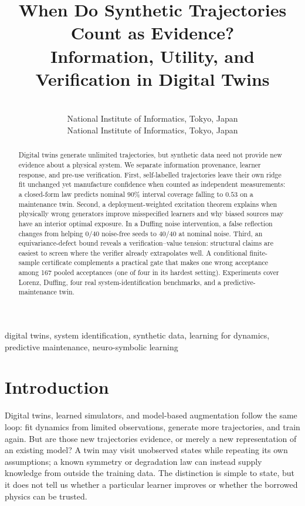 \documentclass{l4dc2027}
\title[When Do Synthetic Trajectories Count as Evidence?]{When Do Synthetic Trajectories Count as Evidence?\\Information, Utility, and Verification in Digital Twins}
\author{%
 \Name{Prasad Cheema} \Email{prasad@nii.ac.jp}\\
 \addr National Institute of Informatics, Tokyo, Japan
 \AND
 \Name{Mahito Sugiyama} \Email{mahito@nii.ac.jp}\\
 \addr National Institute of Informatics, Tokyo, Japan%
}
\begin{document}
\maketitle

\begin{abstract}%
Digital twins generate unlimited trajectories, but synthetic data need not provide new evidence about a physical system. We separate information provenance, learner response, and pre-use verification. First, self-labelled trajectories leave their own ridge fit unchanged yet manufacture confidence when counted as independent measurements: a closed-form law predicts nominal 90\% interval coverage falling to $0.53$ on a maintenance twin. Second, a deployment-weighted excitation theorem explains when physically wrong generators improve misspecified learners and why biased sources may have an interior optimal exposure. In a Duffing noise intervention, a false reflection changes from helping 0/40 noise-free seeds to 40/40 at nominal noise. Third, an equivariance-defect bound reveals a verification--value tension: structural claims are easiest to screen where the verifier already extrapolates well. A conditional finite-sample certificate complements a practical gate that makes one wrong acceptance among 167 pooled acceptances (one of four in its hardest setting). Experiments cover Lorenz, Duffing, four real system-identification benchmarks, and a predictive-maintenance twin.%
\end{abstract}

\begin{keywords}%
digital twins, system identification, synthetic data, learning for dynamics, predictive maintenance, neuro-symbolic learning
\end{keywords}

\section{Introduction}
Digital twins, learned simulators, and model-based augmentation follow the same loop: fit dynamics from limited observations, generate more trajectories, and train again. But are those new trajectories evidence, or merely a new representation of an existing model? A twin may visit unobserved states while repeating its own assumptions; a known symmetry or degradation law can instead supply knowledge from outside the training data. The distinction is simple to state, but it does not tell us whether a particular learner improves or whether the borrowed physics can be trusted.
\end{document}
